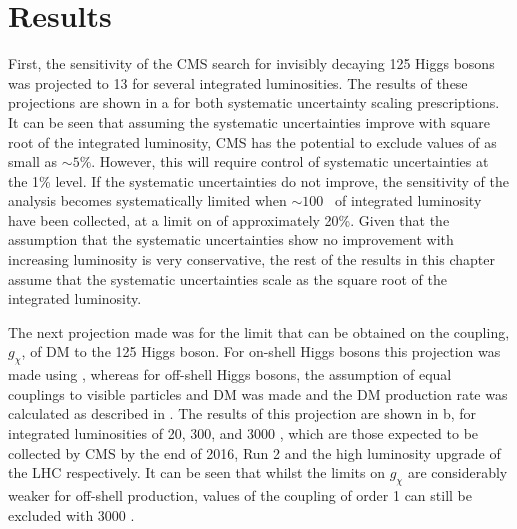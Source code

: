 \section{Results}
\label{sec:dmresults}
First, the sensitivity of the CMS search for invisibly decaying 125 \GeV Higgs bosons was projected to 13 \TeV for several integrated luminosities. The results of these projections are shown in a for both systematic uncertainty scaling prescriptions. It can be seen that assuming the systematic uncertainties improve with square root of the integrated luminosity, CMS has the potential to exclude values of \BRinv as small as $\sim 5\%$. However, this will require control of systematic uncertainties at the 1\% level. If the systematic uncertainties do not improve, the sensitivity of the analysis becomes systematically limited when $\sim 100$ \invfb\, of integrated luminosity have been collected, at  a limit on \BRinv of approximately 20\%. Given that the assumption that the systematic uncertainties show no improvement with increasing luminosity is very conservative, the rest of the results in this chapter assume that the systematic uncertainties scale as the square root of the integrated luminosity.

The next projection made was for the limit that can be obtained on the coupling, $g_{\chi}$, of \ac{DM} to the 125 \GeV Higgs boson. For on-shell Higgs bosons this projection was made using , whereas for off-shell Higgs bosons, the assumption of equal couplings to visible particles and \ac{DM} was made and the \ac{DM} production rate was calculated as described in . The results of this projection are shown in b, for integrated luminosities of 20, 300, and 3000 \invfb, which are those expected to be collected by CMS by the end of 2016, Run 2 and the high luminosity upgrade of the LHC respectively. It can be seen that whilst the limits on $g_{\chi}$ are considerably weaker for off-shell production, values of the coupling of order 1 can still be excluded with 3000 \invfb.


